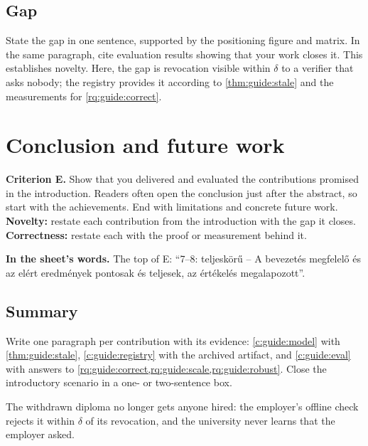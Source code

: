 \subsection{Gap}\label{app:chapters:gap}
State the gap in one sentence, supported by the positioning figure and matrix. In the same paragraph, cite evaluation results showing that your work closes it. This establishes novelty. Here, the gap is revocation visible within $\delta$ to a verifier that asks nobody; the registry provides it according to \cref{thm:guide:stale} and the measurements for \cref{rq:guide:correct}.

\section{Conclusion and future work}\label{app:chapters:conclusion}
\textbf{Criterion E.} Show that you delivered and evaluated the contributions promised in the introduction. Readers often open the conclusion just after the abstract, so start with the achievements. End with limitations and concrete future work.
\textbf{Novelty:} restate each contribution from the introduction with the gap it closes.
\textbf{Correctness:} restate each with the proof or measurement behind it.

\textbf{In the sheet's words.} The top of E: \enquote{7--8: teljeskörű -- A bevezetés megfelelő és az elért eredmények pontosak és teljesek, az értékelés megalapozott}.

\subsection[Summary]{Summary\skimmark}\label{app:chapters:summary}
Write one paragraph per contribution with its evidence: \cref{c:guide:model} with \cref{thm:guide:stale}, \cref{c:guide:registry} with the archived artifact, and \cref{c:guide:eval} with answers to \cref{rq:guide:correct,rq:guide:scale,rq:guide:robust}. Close the introductory scenario in a one- or two-sentence box.
\begin{runningexample}[in retrospect]
The withdrawn diploma no longer gets anyone hired: the employer's offline check rejects it within $\delta$ of its revocation, and the university never learns that the employer asked.
\end{runningexample}

